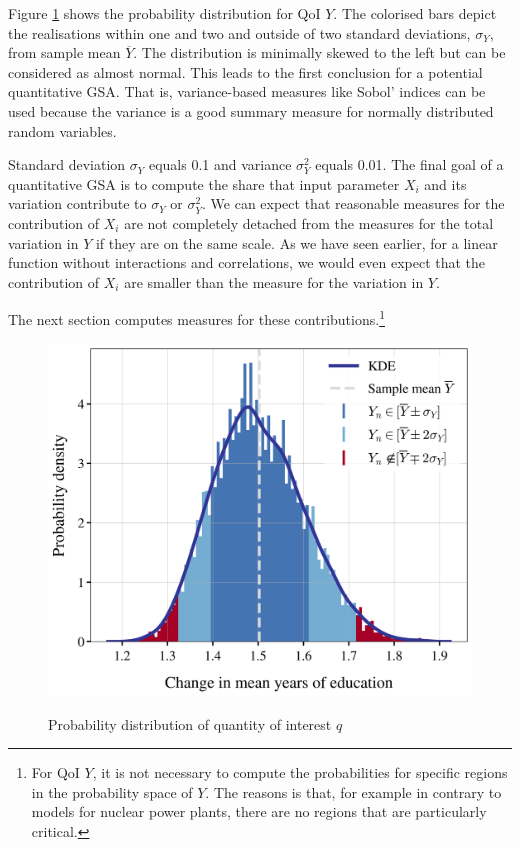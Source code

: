 \documentclass[a4paper,12pt]{article}
\begin{document}
\noindent
Figure \ref{fig:dist} shows the probability distribution for QoI $Y$. The colorised bars depict the realisations within one and two and outside of two standard deviations, $\sigma_Y$, from sample mean $\overline{Y}$.  The distribution is minimally skewed to the left but can be considered as almost normal. This leads to the first conclusion for a potential quantitative GSA. That is, variance-based measures like Sobol' indices can be used because the variance is a good summary measure for normally distributed random variables.

Standard deviation $\sigma_Y$ equals 0.1 and variance $\sigma_Y^2$ equals 0.01. The final goal of a quantitative GSA is to compute the share that input parameter $X_i$ and its variation contribute to $\sigma_Y$ or $\sigma_Y^2$. We can expect that reasonable measures for the contribution of $X_i$ are not completely detached from the measures for the total variation in $Y$ if they are on the same scale. As we have seen earlier, for a linear function without interactions and correlations, we would even expect that the contribution of $X_i$ are smaller than the measure for the variation in $Y$.

The next section computes measures for these contributions.\footnote{For QoI $Y$, it is not necessary to compute the probabilities for specific regions in the probability space of $Y$. The reasons is that, for example in contrary to models for nuclear power plants, there are no regions that are particularly critical.}
\begin{figure}[H]
	\caption{Probability distribution of quantity of interest $q$}
	\centering
	\includegraphics[scale=0.5]{../../../scrypy/figures/distplot}
	\label{fig:dist}
\end{figure}
\end{document}
